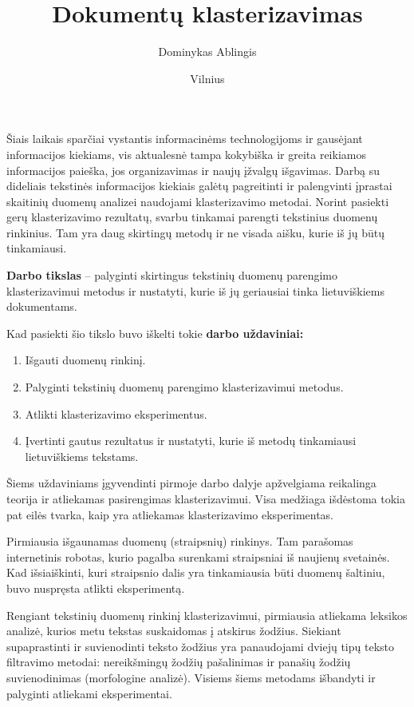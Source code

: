 \documentclass{VUMIFInfBakalaurinis}
\title{Dokumentų klasterizavimas}
\author{Dominykas Ablingis}
\date{Vilnius \\ \the\year}
\providecommand{\tightlist}{%
	  \setlength{\itemsep}{0pt}\setlength{\parskip}{0pt}}
\begin{document}
\maketitle
\tableofcontents


Šiais laikais sparčiai vystantis informacinėms technologijoms ir
gausėjant informacijos kiekiams, vis aktualesnė tampa kokybiška ir
greita reikiamos informacijos paieška, jos organizavimas ir naujų
įžvalgų išgavimas. Darbą su dideliais tekstinės informacijos kiekiais
galėtų pagreitinti ir palengvinti įprastai skaitinių duomenų analizei
naudojami klasterizavimo metodai. Norint pasiekti gerų klasterizavimo
rezultatų, svarbu tinkamai parengti tekstinius duomenų rinkinius. Tam
yra daug skirtingų metodų ir ne visada aišku, kurie iš jų būtų
tinkamiausi.

\textbf{Darbo tikslas} -- palyginti skirtingus tekstinių duomenų
parengimo klasterizavimui metodus ir nustatyti, kurie iš jų geriausiai
tinka lietuviškiems dokumentams.

Kad pasiekti šio tikslo buvo iškelti tokie \textbf{darbo uždaviniai:}

\begin{enumerate}
\def\labelenumi{\arabic{enumi}.}
\tightlist
\item
  Išgauti duomenų rinkinį.
\item
  Palyginti tekstinių duomenų parengimo klasterizavimui metodus.
\item
  Atlikti klasterizavimo eksperimentus.
\item
  Įvertinti gautus rezultatus ir nustatyti, kurie iš metodų tinkamiausi
  lietuviškiems tekstams.
\end{enumerate}

Šiems uždaviniams įgyvendinti pirmoje darbo dalyje apžvelgiama
reikalinga teorija ir atliekamas pasirengimas klasterizavimui. Visa
medžiaga išdėstoma tokia pat eilės tvarka, kaip yra atliekamas
klasterizavimo eksperimentas.

Pirmiausia išgaunamas duomenų (straipsnių) rinkinys. Tam parašomas
  internetinis robotas, kurio pagalba surenkami straipsniai iš naujienų
  svetainės. Kad išsiaiškinti, kuri straipsnio dalis yra tinkamiausia
  būti duomenų šaltiniu, buvo nuspręsta atlikti eksperimentą.

Rengiant tekstinių duomenų rinkinį klasterizavimui, pirmiausia
  atliekama leksikos analizė, kurios metu tekstas suskaidomas į atskirus
  žodžius. Siekiant supaprastinti ir suvienodinti teksto žodžius yra
  panaudojami dviejų tipų teksto filtravimo metodai: nereikšmingų žodžių
  pašalinimas ir panašių žodžių suvienodinimas (morfologine analizė).
  Visiems šiems metodams išbandyti ir palyginti atliekami eksperimentai.
\end{document}
